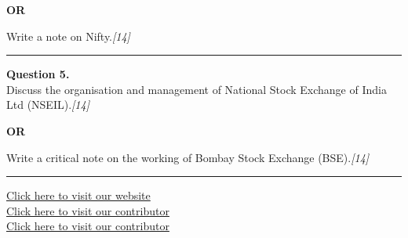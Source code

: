 \documentclass[11pt,a4paper]{article}
\newcommand{\pts}[1]{\hfill   \textit{[#1]}}
\begin{document}
\centerline{   \textbf{OR}}

Write a note on Nifty.\pts{14}

\medskip\rule{\linewidth}{0.2pt}




\noindent   \textbf{Question 5.} \\
Discuss the organisation and management of National Stock Exchange of India Ltd (NSEIL).\pts{14}

\centerline{   \textbf{OR}}

Write a critical note on the working of Bombay Stock Exchange (BSE).\pts{14}

\vfill
\rule{\linewidth}{0.4pt}

\begin{center}\small
\href{https://bhu-exam.vercel.app/}{Click here to visit our website}\\[4pt]
\href{https://me-aryan.vercel.app/}{Click here to visit our contributor}\\[4pt]
\href{https://quashan-me.vercel.app/}{Click here to visit our contributor}
\end{center}
\end{document}
